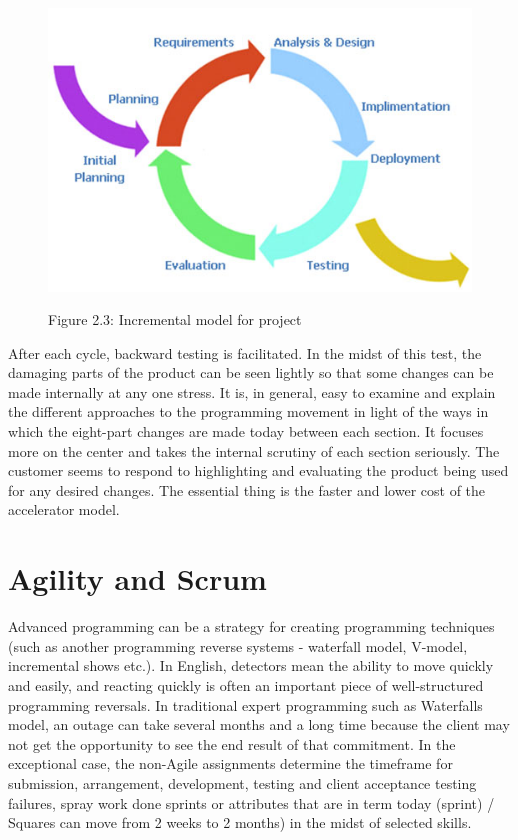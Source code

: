 \documentclass[oneside,12pt]{Classes/VTU}
\begin{document}
    	
    	\begin{figure}
    		\begin{center}
    			\includegraphics[]{images/cycle.jpg}
    		\end{center}
    		
    		
    		\begin{center}
    			Figure 2.3: Incremental model for project
    		\end{center}
    	\end{figure}
    	After each cycle, backward testing is facilitated. In the midst of this test, the damaging parts of the product can be seen lightly so that some changes can be made internally at any one stress. It is, in general, easy to examine and explain the different approaches to the programming movement in light of the ways in which the eight-part changes are made today between each section. It focuses more on the center and takes the internal scrutiny of each section seriously. The customer seems to respond to highlighting and evaluating the product being used for any desired changes. The essential thing is the faster and lower cost of the accelerator model.
    	
    	\section{Agility and Scrum}
    	Advanced programming can be a strategy for creating programming techniques (such as another programming reverse systems - waterfall model, V-model, incremental shows etc.). In English, detectors mean the ability to move quickly and easily, and reacting quickly is often an important piece of well-structured programming reversals.
    	In traditional expert programming such as Waterfalls model, an outage can take several months and a long time because the client may not get the opportunity to see the end result of that commitment. In the exceptional case, the non-Agile assignments determine the timeframe for submission, arrangement, development, testing and client acceptance testing failures, spray work done sprints or attributes that are in term today (sprint) / Squares can move from 2 weeks to 2 months) in the midst of selected skills.
    	
\end{document}
